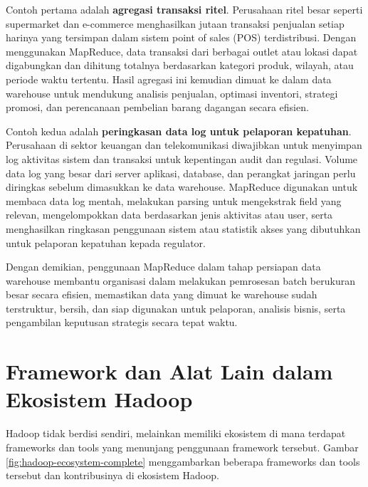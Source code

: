 Contoh pertama adalah \textbf{agregasi transaksi ritel}. Perusahaan ritel besar seperti supermarket dan e-commerce menghasilkan jutaan transaksi penjualan setiap harinya yang tersimpan dalam sistem point of sales (POS) terdistribusi. Dengan menggunakan MapReduce, data transaksi dari berbagai outlet atau lokasi dapat digabungkan dan dihitung totalnya berdasarkan kategori produk, wilayah, atau periode waktu tertentu. Hasil agregasi ini kemudian dimuat ke dalam data warehouse untuk mendukung analisis penjualan, optimasi inventori, strategi promosi, dan perencanaan pembelian barang dagangan secara efisien.

Contoh kedua adalah \textbf{peringkasan data log untuk pelaporan kepatuhan}. Perusahaan di sektor keuangan dan telekomunikasi diwajibkan untuk menyimpan log aktivitas sistem dan transaksi untuk kepentingan audit dan regulasi. Volume data log yang besar dari server aplikasi, database, dan perangkat jaringan perlu diringkas sebelum dimasukkan ke data warehouse. MapReduce digunakan untuk membaca data log mentah, melakukan parsing untuk mengekstrak field yang relevan, mengelompokkan data berdasarkan jenis aktivitas atau user, serta menghasilkan ringkasan penggunaan sistem atau statistik akses yang dibutuhkan untuk pelaporan kepatuhan kepada regulator.

Dengan demikian, penggunaan MapReduce dalam tahap persiapan data warehouse membantu organisasi dalam melakukan pemrosesan batch berukuran besar secara efisien, memastikan data yang dimuat ke warehouse sudah terstruktur, bersih, dan siap digunakan untuk pelaporan, analisis bisnis, serta pengambilan keputusan strategis secara tepat waktu.


\section{Framework dan Alat Lain dalam Ekosistem Hadoop}
Hadoop tidak berdisi sendiri, melainkan memiliki ekosistem di mana terdapat frameworks dan tools yang menunjang penggunaan framework tersebut. Gambar \ref{fig:hadoop-ecosystem-complete} menggambarkan beberapa frameworks dan tools tersebut dan kontribusinya di ekosistem Hadoop.


